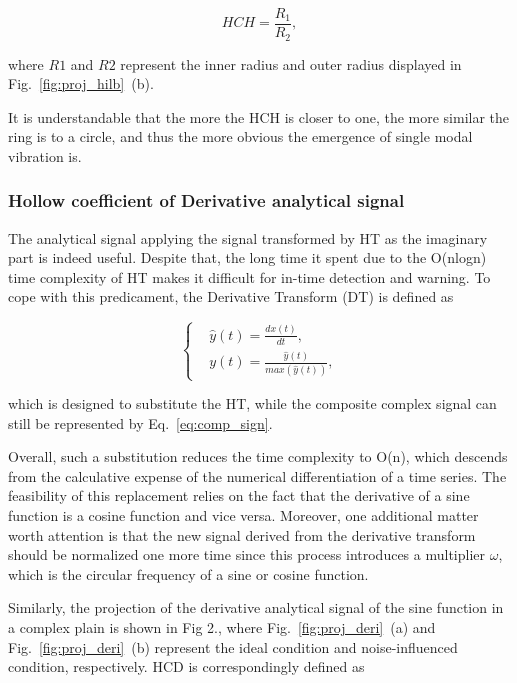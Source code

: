 \documentclass[preprint, 3p, times, compress, 11pt]{elsarticle}
\begin{document}
\begin{equation}
    HCH = \frac{R_1}{R_2},
    \label{eq:HCH}
\end{equation}

where $R1$ and $R2$ represent the inner radius and outer radius 
displayed in Fig.~\ref{fig:proj_hilb}~(b).

It is understandable that the more the HCH is closer to one, the more 
similar the ring is to a circle, and thus the more obvious the emergence 
of single modal vibration is. 

\subsubsection{Hollow coefficient of Derivative analytical signal}

The analytical signal applying the signal transformed by HT as the 
imaginary part is indeed useful. Despite that, the long time it spent 
due to the O(nlogn) time complexity of HT makes it difficult for in-time 
detection and warning. To cope with this predicament, the Derivative 
Transform (DT) is defined as 

\begin{equation}
    \left \{
        \begin{aligned} 
            &\hat{y}(t) = \frac{dx(t)}{dt}, \\ 
            &y(t) = \frac{\hat{y}(t)}{max \left( \hat{y}(t) \right)},
        \end{aligned} 
    \right. 
    \label{eq:deri}
\end{equation}

which is designed to substitute the HT, while the composite complex 
signal can still be represented by Eq.~\eqref{eq:comp_sign}.

Overall, such a substitution reduces the time complexity to O(n), which 
descends from the calculative expense of the numerical differentiation 
of a time series. The feasibility of this replacement relies on the 
fact that the derivative of a sine function is a cosine function and 
vice versa. Moreover, one additional matter worth attention is that 
the new signal derived from the derivative transform should be normalized 
one more time since this process introduces a multiplier $\omega$, which 
is the circular frequency of a sine or cosine function. 

Similarly, the projection of the derivative analytical signal of the sine 
function in a complex plain is shown in Fig 2., where Fig.~\ref{fig:proj_deri}~(a) 
and Fig.~\ref{fig:proj_deri}~(b) represent the ideal condition and 
noise-influenced condition, respectively. HCD is correspondingly defined as 
\end{document}
